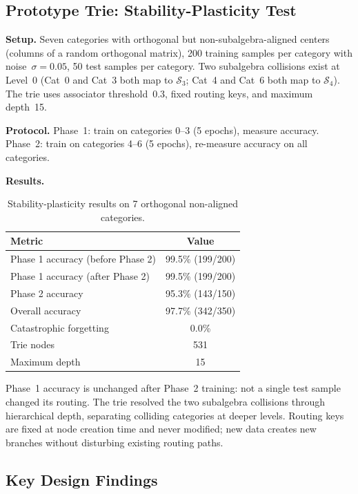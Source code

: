 \documentclass[11pt,a4paper]{article}
\theoremstyle{definition}
\theoremstyle{remark}
\begin{document}
\subsection{Prototype Trie: Stability-Plasticity Test}

\textbf{Setup.} Seven categories with orthogonal but non-subalgebra-aligned centers (columns of a random orthogonal matrix), 200 training samples per category with noise~$\sigma = 0.05$, 50 test samples per category. Two subalgebra collisions exist at Level~0 (Cat~0 and Cat~3 both map to $\mathcal{S}_3$; Cat~4 and Cat~6 both map to $\mathcal{S}_4$). The trie uses associator threshold~0.3, fixed routing keys, and maximum depth~15.

\textbf{Protocol.} Phase~1: train on categories 0--3 (5 epochs), measure accuracy. Phase~2: train on categories 4--6 (5 epochs), re-measure accuracy on all categories.

\textbf{Results.}

\begin{table}[ht]
\centering
\caption{Stability-plasticity results on 7 orthogonal non-aligned categories.}
\label{tab:stability}
\begin{tabular}{@{}lc@{}}
\toprule
Metric & Value \\
\midrule
Phase 1 accuracy (before Phase 2) & 99.5\% (199/200) \\
Phase 1 accuracy (after Phase 2) & 99.5\% (199/200) \\
Phase 2 accuracy & 95.3\% (143/150) \\
Overall accuracy & 97.7\% (342/350) \\
Catastrophic forgetting & 0.0\% \\
Trie nodes & 531 \\
Maximum depth & 15 \\
\bottomrule
\end{tabular}
\end{table}

Phase~1 accuracy is unchanged after Phase~2 training: not a single test sample changed its routing. The trie resolved the two subalgebra collisions through hierarchical depth, separating colliding categories at deeper levels. Routing keys are fixed at node creation time and never modified; new data creates new branches without disturbing existing routing paths.

\subsection{Key Design Findings}
\end{document}
